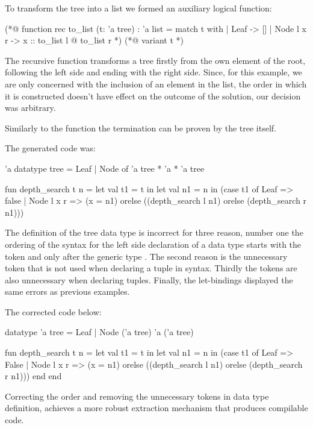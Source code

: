 To transform the tree into a list we formed an auxiliary logical function:

\begin{gospell}
(*@ function rec to_list (t: 'a tree) : 'a list = 
  match t with
  | Leaf -> []
  | Node l x r -> x :: to_list l @ to_list r
*)
(*@
  variant t
*)
\end{gospell}

The recursive function  transforms a tree firstly from the own element of the root, following the left side and 
ending with the right side. Since, for this example, we are only concerned with the inclusion of an element in the list, the order 
in which it is constructed doesn't have effect on the outcome of the solution, our decision was arbitrary.

Similarly to the function  the termination can be proven by the tree itself.

The generated \cml code was:

\begin{cakeml}
'a datatype tree = Leaf | Node of 'a tree * 'a * 'a tree

fun depth_search t n = let val t1 = t in
  let val n1 = n in
  (case t1 of
    Leaf => false
  | Node l x r =>
    (x = n1) orelse ((depth_search l n1) orelse (depth_search r n1)))
\end{cakeml}

The definition of the tree data type is incorrect for three reason, number one the ordering of the syntax for the left side declaration of
a data type starts with the token  and only after the generic type . The second reason is the
unnecessary token  that is not used when declaring a tuple in \cml syntax. Thirdly the tokens \inlinecode{*} are also
unnecessary when declaring tuples. Finally, the let-bindings displayed the same errors as previous examples.

The corrected code below:

\begin{cakeml}
datatype 'a tree = Leaf | Node ('a tree) 'a ('a tree)

fun depth_search t n = let val t1 = t in
  let val n1 = n in
  (case t1 of
    Leaf => False
  | Node l x r =>
    (x = n1) orelse ((depth_search l n1) orelse (depth_search r n1)))
    end end
\end{cakeml}

Correcting the order and removing the unnecessary tokens in data type definition, achieves a more robust extraction mechanism that 
produces compilable \cml code.

